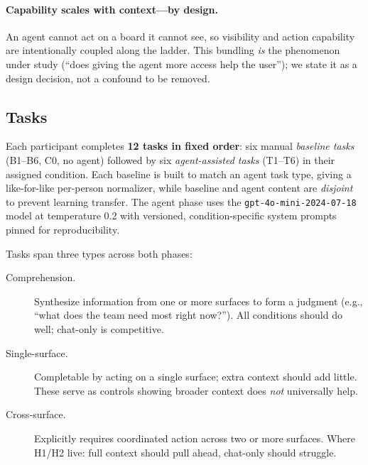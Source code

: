 \paragraph{Capability scales with context---by design.} An agent cannot act on
a board it cannot see, so visibility and action capability are intentionally
coupled along the ladder. This bundling \emph{is} the phenomenon under study
(``does giving the agent more access help the user''); we state it as a design
decision, not a confound to be removed.

\subsection{Tasks}
\label{sec:study:tasks}

Each participant completes \textbf{12 tasks in fixed order}: six manual
\emph{baseline tasks} (B1--B6, C0, no agent) followed by six \emph{agent-assisted
tasks} (T1--T6) in their assigned condition. Each baseline is built to match an
agent task type, giving a like-for-like per-person normalizer, while baseline
and agent content are \emph{disjoint} to prevent learning transfer. The agent
phase uses the \texttt{gpt-4o-mini-2024-07-18} model at temperature 0.2 with
versioned, condition-specific system prompts pinned for reproducibility.

Tasks span three types across both phases:

\begin{description}
  \item[Comprehension.] Synthesize information from one or more surfaces to form
    a judgment (e.g., ``what does the team need most right now?''). All
    conditions should do well; chat-only is competitive.
  \item[Single-surface.] Completable by acting on a single surface; extra context
    should add little. These serve as controls showing broader context does
    \emph{not} universally help.
  \item[Cross-surface.] Explicitly requires coordinated action across two or more
    surfaces. Where H1/H2 live: full context should pull ahead, chat-only should
    struggle.
\end{description}

